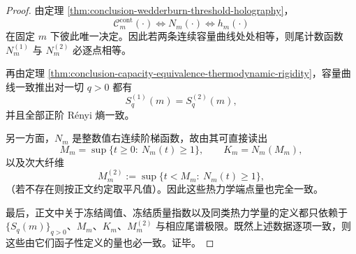 \begin{proof}
由定理 \ref{thm:conclusion-wedderburn-threshold-holography}，
\[
\mathcal C_m^{\mathrm{cont}}(\cdot)
\Longleftrightarrow
N_m(\cdot)
\Longleftrightarrow
h_m(\cdot)
\]
在固定 \(m\) 下彼此唯一决定。因此若两条连续容量曲线处处相等，则尾计数函数 \(N_m^{(1)}\) 与 \(N_m^{(2)}\) 必逐点相等。

再由定理 \ref{thm:conclusion-capacity-equivalence-thermodynamic-rigidity}，容量曲线一致推出对一切 \(q>0\) 都有
\[
S_q^{(1)}(m)=S_q^{(2)}(m),
\]
并且全部正阶 Rényi 熵一致。

另一方面，\(N_m\) 是整数值右连续阶梯函数，故由其可直接读出
\[
M_m=\sup\{t\ge 0:\ N_m(t)\ge 1\},
\qquad
K_m=N_m(M_m),
\]
以及次大纤维
\[
M_m^{(2)}:=\sup\{t<M_m:\ N_m(t)\ge 1\},
\]
（若不存在则按正文约定取平凡值）。因此这些热力学端点量也完全一致。

最后，正文中关于冻结阈值、冻结质量指数以及同类热力学量的定义都只依赖于 \(\{S_q(m)\}_{q>0}\)、\(M_m\)、\(K_m\)、\(M_m^{(2)}\) 与相应尾谱极限。既然上述数据逐项一致，则这些由它们函子性定义的量也必一致。证毕。
\end{proof}

